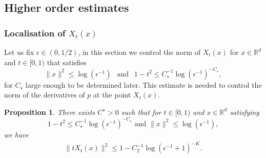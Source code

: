 \documentclass{article}
\newtheorem{proposition}{Proposition}
\begin{document}
\subsection{Higher order estimates}


\subsubsection{Localisation of $X_t(x)$}
Let us fix $\epsilon\in (0,1/2)$, in this section we control the norm of  $X_t(x)$ for $x\in \mathbb{R}^d$ and $t\in [0,1)$ that satisfies
\begin{equation}\label{eq:hyp1}
    \|x\|^2\leq \log(\epsilon^{-1})\ \ \text{ and }\ \ 1-t^2\leq C_\star^{-1}\log(\epsilon^{-1})^{-C_\star},
\end{equation}
for $C_\star$ large enough to be determined later. This estimate is needed to control the norm of the derivatives of $p$ at the point $X_t(x)$. 
\begin{proposition}\label{prop:loca3}
There exists $C^\star>0$ such that for $t\in [0,1)$  and $x\in \mathbb{R}^d$ satisfying \begin{equation*}
1-t^2\leq C_\star^{-1}\log(\epsilon^{-1})^{-C_\star} \text{ and } \|x\|^2\leq \log(\epsilon^{-1}),
\end{equation*} 
we have
\begin{align*}
\|tX_t(x)\|^2 \leq 1-C_2^{-1}\log(\epsilon^{-1}+1)^{-K}.
\end{align*}
\end{proposition}
\end{document}
